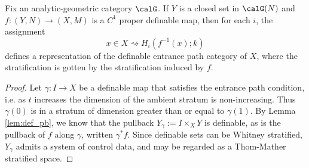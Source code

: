 \begin{thm}\label{thm:strat_maps}
	Fix an analytic-geometric category $\calG$. If $Y$ is a closed set in $\calG(N)$ and $f:(Y,N)\to (X,M)$ is a $C^1$ proper definable map, then for each $i$, the assignment
	\[
		x\in X \rightsquigarrow H_i(f^{-1}(x);k)
 	\]
defines a representation of the definable entrance path category of $X$, where the stratification is gotten by the stratification induced by $f$.
\end{thm}
\begin{proof}
	Let $\gamma:I\to X$ be a definable map that satisfies the entrance path condition, i.e. as $t$ increases the dimension of the ambient stratum is non-increasing. Thus $\gamma(0)$ is in a stratum of dimension greater than or equal to $\gamma(1)$. By Lemma \ref{lem:def_pb}, we know that the pullback $Y_{\gamma}:=I\times_X Y$ is definable, as is the pullback of $f$ along $\gamma$, written $\gamma^*f$. Since definable sets can be Whitney stratified, $Y_{\gamma}$ admits a system of control data, and may be regarded as a Thom-Mather stratified space.
	

\end{proof}
